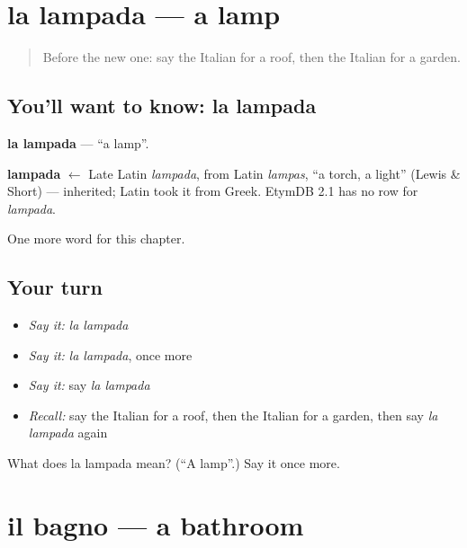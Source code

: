 \section[la lampada]{la lampada — a lamp}

\label{lesson:IT-C57-lampada}



\begin{quote}
Before the new one: say the Italian for a roof, then the Italian for a garden.
\end{quote}

\subsection*{You'll want to know: la lampada}
\textbf{la lampada} — \textquotedblleft{}a lamp\textquotedblright{}.

\begin{cousinweb}
\textbf{lampada} $\leftarrow$ Late Latin \emph{lampada}, from Latin \emph{lampas}, \textquotedblleft{}a torch, a light\textquotedblright{} (Lewis \& Short) — inherited; Latin took it from Greek. EtymDB 2.1 has no row for \emph{lampada}.
\end{cousinweb}

\begin{grammarlens}[title={What you've built}]
One more word for this chapter.
\end{grammarlens}

\subsection*{Your turn}
\begin{itemize}
\raggedright
  \item \emph{Say it:} \emph{la lampada}
  \item \emph{Say it:} \emph{la lampada}, once more
  \item \emph{Say it:} say \emph{la lampada}
  \item \emph{Recall:} say the Italian for a roof, then the Italian for a garden, then say \emph{la lampada} again
\end{itemize}

\begin{tcolorbox}[breakable,colback=teal!4,colframe=teal!35!black,title={Before you move on}]
What does la lampada mean? (\textquotedblleft{}A lamp\textquotedblright{}.) Say it once more.
\end{tcolorbox}
\section[il bagno]{il bagno — a bathroom}

